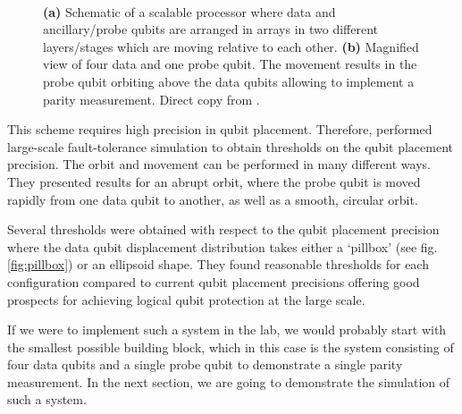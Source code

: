 \begin{figure}[H]
	\centering
	\\
	\caption[paper]{\textbf{(a)} Schematic of a scalable processor where data and ancillary/probe qubits are arranged in arrays in two different layers/stages which are moving relative to each other. \textbf{(b)} Magnified view of four data and one probe qubit. The movement results in the probe qubit orbiting above the data qubits allowing to implement a parity measurement. Direct copy from \cite{OGorman2016}.}
	\label{FIG:paper}
\end{figure}

This scheme requires high precision in qubit placement. Therefore, \citet{OGorman2016} performed large-scale fault-tolerance simulation to obtain thresholds on the qubit placement precision. The orbit and movement can be performed in many different ways. They presented results for an abrupt orbit, where the probe qubit is moved rapidly from one data qubit to another, as well as a smooth, circular orbit.

Several thresholds were obtained with respect to the qubit placement precision where the data qubit displacement distribution takes either a `pillbox' (see fig.\@ \ref{fig:pillbox}) or an ellipsoid shape. 
They found reasonable thresholds for each configuration compared to current qubit placement precisions offering good prospects for achieving logical qubit protection at the large scale. 

If we were to implement such a system in the lab, we would probably start with the smallest possible building block, which in this case is the system consisting of four data qubits and a single probe qubit to demonstrate a single parity measurement. In the next section, we are going to demonstrate the simulation of such a system. 
